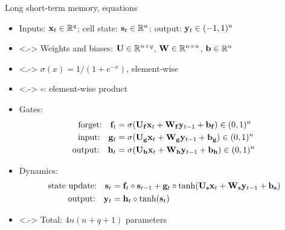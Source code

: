 \begin{frame}{Long short-term memory, equations}
    \begin{itemize}
        \item<+-> Inputs: $\mathbf{x}_t \in \mathbb{R}^q$; cell state: $\mathbf{s}_t \in \mathbb{R}^n$; output: $\mathbf{y}_t \in (-1, 1)^n$
        \item<.-> Weights and biases: $\mathbf{U} \in \mathbb{R}^{n \times q}$, $\mathbf{W} \in \mathbb{R}^{n \times n}$, $\mathbf{b} \in \mathbb{R}^n$
        \item<.-> $\sigma(x) = 1 / (1 + e^{-x})$, element-wise
        \item<.-> $\circ$: element-wise product
        \item<+-> Gates:
        \begin{align*}
            \text{forget:} \quad \mathbf{f}_t &= \sigma(\mathbf{U}_{\mathbf{f}} \mathbf{x}_t + \mathbf{W}_{\mathbf{f}} \mathbf{y}_{t-1} + \mathbf{b}_{\mathbf{f}}) \in (0, 1)^n \\
            \text{input:} \quad \mathbf{g}_t &= \sigma(\mathbf{U}_{\mathbf{g}} \mathbf{x}_t + \mathbf{W}_{\mathbf{g}} \mathbf{y}_{t-1} + \mathbf{b}_{\mathbf{g}}) \in (0, 1)^n \\
            \text{output:} \quad \mathbf{h}_t &= \sigma(\mathbf{U}_{\mathbf{h}} \mathbf{x}_t + \mathbf{W}_{\mathbf{h}} \mathbf{y}_{t-1} + \mathbf{b}_{\mathbf{h}}) \in (0, 1)^n
        \end{align*}
        \item<+-> Dynamics:
        \begin{align*}
            \text{state update:} \quad \mathbf{s}_t &= \mathbf{f}_t \circ \mathbf{s}_{t-1} + \mathbf{g}_t \circ \tanh(\mathbf{U}_{\mathbf{s}} \mathbf{x}_t + \mathbf{W}_{\mathbf{s}} \mathbf{y}_{t-1} + \mathbf{b}_{\mathbf{s}}) \\
            \text{output:} \quad \mathbf{y}_t &= \mathbf{h}_t \circ \tanh(\mathbf{s}_t)
        \end{align*}
        \item<.-> Total: $4 n (n + q + 1)$ parameters
    \end{itemize}
\end{frame}

